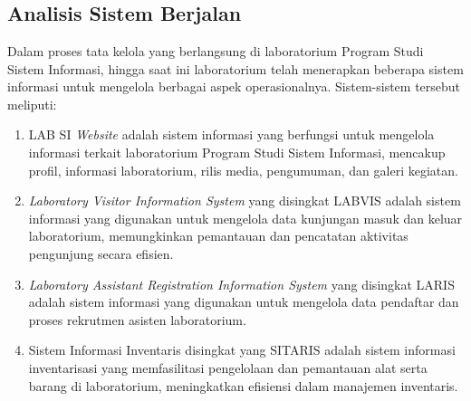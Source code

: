%
%
%
%


\chapter{\babEmpat}
\section{Analisis Sistem Berjalan}
Dalam proses tata kelola yang berlangsung di laboratorium Program Studi Sistem Informasi, hingga saat ini laboratorium telah menerapkan beberapa sistem informasi untuk mengelola berbagai aspek operasionalnya. Sistem-sistem tersebut meliputi:

\begin{enumerate}
	\item LAB SI \textit{Website} adalah sistem informasi yang berfungsi untuk mengelola informasi terkait laboratorium Program Studi Sistem Informasi, mencakup profil, informasi laboratorium, rilis media, pengumuman, dan galeri kegiatan.

	\item \textit{Laboratory Visitor Information System} yang disingkat LABVIS adalah sistem informasi yang digunakan untuk mengelola data kunjungan masuk dan keluar laboratorium, memungkinkan pemantauan dan pencatatan aktivitas pengunjung secara efisien.

	\item \textit{Laboratory Assistant Registration Information System} yang disingkat LARIS adalah sistem informasi yang digunakan untuk mengelola data pendaftar dan proses rekrutmen asisten laboratorium.

	\item Sistem Informasi Inventaris disingkat yang SITARIS adalah sistem informasi inventarisasi yang memfasilitasi pengelolaan dan pemantauan alat serta barang di laboratorium, meningkatkan efisiensi dalam manajemen inventaris.
\end{enumerate}


